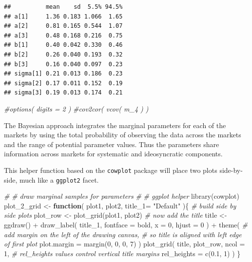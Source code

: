 \documentclass{article}
\newenvironment{Shaded}{\begin{snugshade}}{\end{snugshade}}
\newcommand{\AttributeTok}[1]{\textcolor[rgb]{0.77,0.63,0.00}{#1}}
\newcommand{\CommentTok}[1]{\textcolor[rgb]{0.56,0.35,0.01}{\textit{#1}}}
\newcommand{\ControlFlowTok}[1]{\textcolor[rgb]{0.13,0.29,0.53}{\textbf{#1}}}
\newcommand{\DecValTok}[1]{\textcolor[rgb]{0.00,0.00,0.81}{#1}}
\newcommand{\FloatTok}[1]{\textcolor[rgb]{0.00,0.00,0.81}{#1}}
\newcommand{\FunctionTok}[1]{\textcolor[rgb]{0.00,0.00,0.00}{#1}}
\newcommand{\NormalTok}[1]{#1}
\newcommand{\OtherTok}[1]{\textcolor[rgb]{0.56,0.35,0.01}{#1}}
\newcommand{\SpecialCharTok}[1]{\textcolor[rgb]{0.00,0.00,0.00}{#1}}
\newcommand{\StringTok}[1]{\textcolor[rgb]{0.31,0.60,0.02}{#1}}
\begin{document}
\begin{verbatim}
##          mean    sd  5.5% 94.5%
## a[1]     1.36 0.183 1.066  1.65
## a[2]     0.81 0.165 0.544  1.07
## a[3]     0.48 0.168 0.216  0.75
## b[1]     0.40 0.042 0.330  0.46
## b[2]     0.26 0.040 0.193  0.32
## b[3]     0.16 0.040 0.097  0.23
## sigma[1] 0.21 0.013 0.186  0.23
## sigma[2] 0.17 0.011 0.152  0.19
## sigma[3] 0.19 0.013 0.174  0.21
\end{verbatim}

\begin{Shaded}
\begin{Highlighting}[]
\CommentTok{\#options( digits = 2 )}
\CommentTok{\#cov2cor( vcov( m\_4 ) )}
\end{Highlighting}
\end{Shaded}

The Bayesian approach integrates the marginal parameters for each of the
markets by using the total probability of observing the data across the
markets and the range of potential parameter values. Thus the parameters
share information across markets for systematic and ideosyncratic
components.

This helper function based on the \texttt{cowplot} package will place
two plots side-by-side, much like a \texttt{ggplot2} facet.

\begin{Shaded}
\begin{Highlighting}[]
\CommentTok{\#}
\CommentTok{\# draw marginal samples for parameters}
\CommentTok{\#}
\CommentTok{\# ggplot helper}
\FunctionTok{library}\NormalTok{(cowplot) }
\NormalTok{plot\_2\_grid }\OtherTok{\textless{}{-}} \ControlFlowTok{function}\NormalTok{( plot1, plot2, }\AttributeTok{title\_1=} \StringTok{"Default"}\NormalTok{ )\{ }
    \CommentTok{\# build side by side plots}
\NormalTok{    plot\_row }\OtherTok{\textless{}{-}} \FunctionTok{plot\_grid}\NormalTok{(plot1, plot2)}
    \CommentTok{\# now add the title}
\NormalTok{    title }\OtherTok{\textless{}{-}} \FunctionTok{ggdraw}\NormalTok{() }\SpecialCharTok{+} 
    \FunctionTok{draw\_label}\NormalTok{(}
\NormalTok{      title\_1,}
      \AttributeTok{fontface =} \StringTok{\textquotesingle{}bold\textquotesingle{}}\NormalTok{,}
      \AttributeTok{x =} \DecValTok{0}\NormalTok{,}
      \AttributeTok{hjust =} \DecValTok{0}
\NormalTok{    ) }\SpecialCharTok{+}
    \FunctionTok{theme}\NormalTok{(}
      \CommentTok{\# add margin on the left of the drawing canvas,}
      \CommentTok{\# so title is aligned with left edge of first plot}
      \AttributeTok{plot.margin =} \FunctionTok{margin}\NormalTok{(}\DecValTok{0}\NormalTok{, }\DecValTok{0}\NormalTok{, }\DecValTok{0}\NormalTok{, }\DecValTok{7}\NormalTok{)}
\NormalTok{    )}
    \FunctionTok{plot\_grid}\NormalTok{(}
\NormalTok{    title, plot\_row,}
    \AttributeTok{ncol =} \DecValTok{1}\NormalTok{,}
    \CommentTok{\# rel\_heights values control vertical title margins}
    \AttributeTok{rel\_heights =} \FunctionTok{c}\NormalTok{(}\FloatTok{0.1}\NormalTok{, }\DecValTok{1}\NormalTok{)}
\NormalTok{    )}
\NormalTok{\}}
\end{Highlighting}
\end{Shaded}
\end{document}
